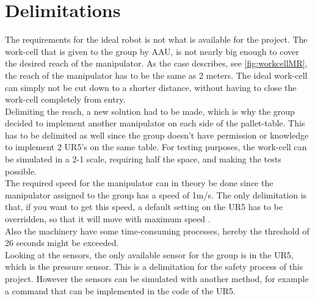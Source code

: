 \section{Delimitations} \label{ch:Delimitations}

The requirements for the ideal robot is not what is available for the project. 
The work-cell that is given to the group by AAU, is not nearly big enough to cover the desired reach of the manipulator. As the case describes, see \ref{fig:workcellMR}, the reach of the manipulator has to be the same as 2 meters. The ideal work-cell can simply not be cut down to a shorter distance, without having to close the work-cell completely from entry.\\
Delimiting the reach, a new solution had to be made, which is why the group decided to implement another manipulator on each side of the pallet-table. This has to be delimited as well since the group doesn't have permission or knowledge to implement 2 UR5's on the same table.
For testing purposes, the work-cell can be simulated in a 2-1 scale, requiring half the space, and making the tests possible. \\
The required speed for the manipulator can in theory be done since the manipulator assigned to the group has a speed of 1m/s. The only delimitation is that, if you want to get this speed, a default setting on the UR5 has to be overridden, so that it will move with maximum speed \cite{UserManual}.\\
Also the machinery have some time-consuming processes, hereby the threshold of 26 seconds might be exceeded.\\
Looking at the sensors, the only available sensor for the group is in the UR5, which is the pressure sensor. This is a delimitation for the safety process of this project. However the sensors can be simulated with another method, for example a command that can be implemented in the code of the UR5.\\
